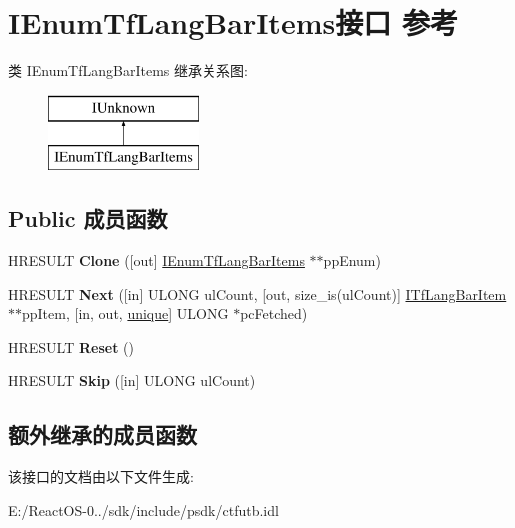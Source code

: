 \hypertarget{interface_i_enum_tf_lang_bar_items}{}\section{I\+Enum\+Tf\+Lang\+Bar\+Items接口 参考}
\label{interface_i_enum_tf_lang_bar_items}
类 I\+Enum\+Tf\+Lang\+Bar\+Items 继承关系图\+:\begin{figure}[H]
\begin{center}
\leavevmode
\includegraphics[height=2.000000cm]{interface_i_enum_tf_lang_bar_items}
\end{center}
\end{figure}
\subsection*{Public 成员函数}
\begin{DoxyCompactItemize}
\item 
\mbox{\label{interface_i_enum_tf_lang_bar_items_afb360ad8fa4a40db81dd8d5096770ab3}} 
H\+R\+E\+S\+U\+LT {\bfseries Clone} (\mbox{[}out\mbox{]} \hyperlink{interface_i_enum_tf_lang_bar_items}{I\+Enum\+Tf\+Lang\+Bar\+Items} $\ast$$\ast$pp\+Enum)
\item 
\mbox{\label{interface_i_enum_tf_lang_bar_items_ae4805eb8f3222b14baae71e9ab9b9c73}} 
H\+R\+E\+S\+U\+LT {\bfseries Next} (\mbox{[}in\mbox{]} U\+L\+O\+NG ul\+Count, \mbox{[}out, size\+\_\+is(ul\+Count)\mbox{]} \hyperlink{interface_i_tf_lang_bar_item}{I\+Tf\+Lang\+Bar\+Item} $\ast$$\ast$pp\+Item, \mbox{[}in, out, \hyperlink{interfaceunique}{unique}\mbox{]} U\+L\+O\+NG $\ast$pc\+Fetched)
\item 
\mbox{\label{interface_i_enum_tf_lang_bar_items_a487456733b0f9f160a441217b0bfd4ce}} 
H\+R\+E\+S\+U\+LT {\bfseries Reset} ()
\item 
\mbox{\label{interface_i_enum_tf_lang_bar_items_a45a0d6eb48f0ede281f1e2f069b3417d}} 
H\+R\+E\+S\+U\+LT {\bfseries Skip} (\mbox{[}in\mbox{]} U\+L\+O\+NG ul\+Count)
\end{DoxyCompactItemize}
\subsection*{额外继承的成员函数}


该接口的文档由以下文件生成\+:\begin{DoxyCompactItemize}
\item 
E\+:/\+React\+O\+S-\/0../sdk/include/psdk/ctfutb.\+idl\end{DoxyCompactItemize}
